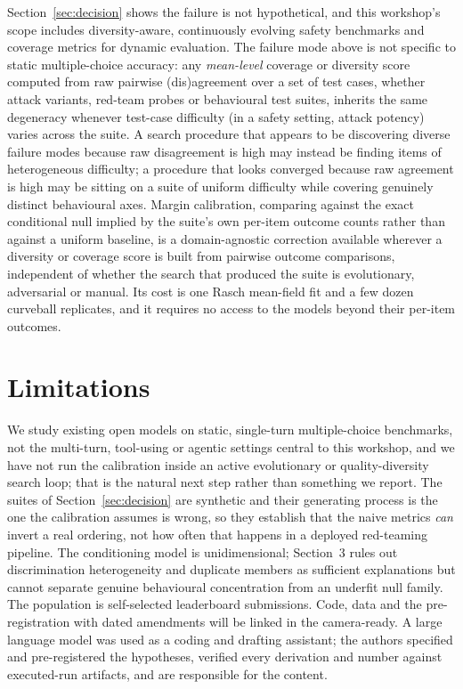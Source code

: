 \documentclass{article}
\begin{document}
Section~\ref{sec:decision} shows the failure is not hypothetical, and this workshop's scope
includes diversity-aware, continuously evolving safety benchmarks and coverage metrics for dynamic
evaluation. The failure mode above is not specific to static
multiple-choice accuracy: any \emph{mean-level} coverage or diversity score computed from raw
pairwise (dis)agreement over a set of test cases, whether attack variants, red-team probes or
behavioural test suites, inherits the same degeneracy whenever test-case difficulty (in a safety
setting, attack potency) varies across the suite. A search procedure that appears to be
discovering diverse failure modes because raw disagreement is high may instead be finding items of
heterogeneous difficulty; a procedure that looks converged because raw agreement is high may be
sitting on a suite of uniform difficulty while covering genuinely distinct behavioural axes.
Margin calibration, comparing against the exact conditional null implied by the suite's own
per-item outcome counts rather than against a uniform baseline, is a domain-agnostic correction
available wherever a diversity or coverage score is built from pairwise outcome comparisons,
independent of whether the search that produced the suite is evolutionary, adversarial or
manual. Its cost is one Rasch mean-field fit and a few dozen curveball replicates, and it
requires no access to the models beyond their per-item outcomes.

\section{Limitations}

We study existing open models on static, single-turn multiple-choice benchmarks, not the
multi-turn, tool-using or agentic settings central to this workshop, and we have not run the
calibration inside an active evolutionary or quality-diversity search loop; that is the natural
next step rather than something we report. The suites of Section~\ref{sec:decision} are synthetic
and their generating process is the one the calibration assumes is wrong, so they establish that
the naive metrics \emph{can} invert a real ordering, not how often that happens in a deployed
red-teaming pipeline. The conditioning model is unidimensional; Section~3
rules out discrimination heterogeneity and duplicate members as sufficient explanations but cannot
separate genuine behavioural concentration from an underfit null family. The population is
self-selected leaderboard submissions. Code, data and the pre-registration with dated amendments
will be linked in the camera-ready. A large language model was used as a coding and drafting
assistant; the authors specified and pre-registered the hypotheses, verified every derivation and
number against executed-run artifacts, and are responsible for the content.
\end{document}
